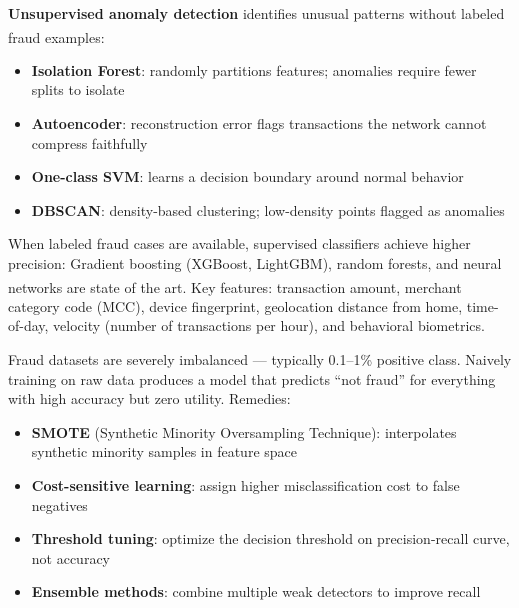 \begin{tcbitemize}[ skin=sectionraster ]

    \tcbitem[title=Anomaly Detection Approaches, raster multicolumn=3]
    \textbf{Unsupervised anomaly detection} identifies unusual patterns without labeled fraud examples\textsuperscript{\cite[][p.~150]{jansenMachineLearningAlgorithmic2020}}:
    \tcblower
    \begin{itemize}
        \item \textbf{Isolation Forest}: randomly partitions features; anomalies require fewer splits to isolate
        \item \textbf{Autoencoder}: reconstruction error flags transactions the network cannot compress faithfully
        \item \textbf{One-class SVM}: learns a decision boundary around normal behavior
        \item \textbf{DBSCAN}: density-based clustering; low-density points flagged as anomalies
    \end{itemize}

    \tcbitem[title=Supervised Classification for Fraud, raster multicolumn=3]
    When labeled fraud cases are available, supervised classifiers achieve higher precision:
    Gradient boosting (XGBoost, LightGBM), random forests, and neural networks are state of the art\textsuperscript{\cite[][pp.~345--346]{jansenMachineLearningAlgorithmic2020}}.
    Key features: transaction amount, merchant category code (MCC), device fingerprint, geolocation distance from home, time-of-day, velocity (number of transactions per hour), and behavioral biometrics.

    \tcbitem[title=Class Imbalance Problem, raster multicolumn=3]
    Fraud datasets are severely imbalanced — typically 0.1--1\% positive class.
    Naively training on raw data produces a model that predicts ``not fraud'' for everything with high accuracy but zero utility.
    \tcblower
    Remedies:
    \begin{itemize}
        \item \textbf{SMOTE} (Synthetic Minority Oversampling Technique): interpolates synthetic minority samples in feature space
        \item \textbf{Cost-sensitive learning}: assign higher misclassification cost to false negatives
        \item \textbf{Threshold tuning}: optimize the decision threshold on precision-recall curve, not accuracy
        \item \textbf{Ensemble methods}: combine multiple weak detectors to improve recall
    \end{itemize}


\end{tcbitemize}
